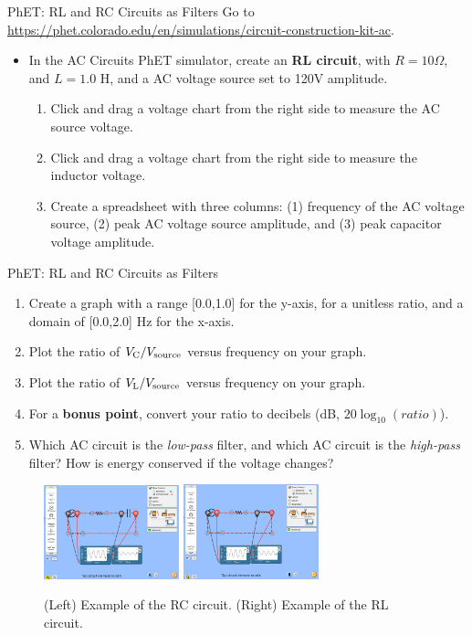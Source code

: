 \documentclass{beamer}
\begin{document}
\begin{frame}{PhET: RL and RC Circuits as Filters}
\footnotesize
Go to \url{https://phet.colorado.edu/en/simulations/circuit-construction-kit-ac}.
\begin{itemize}
\footnotesize
\item In the AC Circuits PhET simulator, create an \textbf{\alert{RL circuit}}, with $R = 10 \Omega$, and $L = 1.0$ H, and a AC voltage source set to 120V amplitude.
\begin{enumerate}
\footnotesize
\item Click and drag a voltage chart from the right side to measure the AC source voltage.
\item Click and drag a voltage chart from the right side to measure the inductor voltage.
\item Create a spreadsheet with three columns: (1) frequency of the AC voltage source, (2) peak AC voltage source amplitude, and (3) peak capacitor voltage amplitude.
\end{enumerate}
\end{itemize}
\end{frame}

\begin{frame}{PhET: RL and RC Circuits as Filters}
\footnotesize
\begin{enumerate}
\item Create a graph with a range [0.0,1.0] for the y-axis, for a unitless ratio, and a domain of [0.0,2.0] Hz for the x-axis.
\item Plot the ratio of $V_{\rm C}/V_{\rm source}$ versus frequency on your graph.
\item Plot the ratio of $V_{\rm L}/V_{\rm source}$ versus frequency on your graph.
\item For a \textbf{bonus point}, convert your ratio to decibels (dB, $20\log_{10}(ratio)$).
\item Which AC circuit is the \textit{low-pass} filter, and which AC circuit is the \textit{high-pass} filter?  How is energy conserved if the voltage changes?
\end{enumerate}
\begin{figure}
\centering
\includegraphics[width=0.35\textwidth]{figures/RC_PhET.png}
\includegraphics[width=0.35\textwidth]{figures/RL_PhET.png}
\caption{\label{fig:RC_RL_PhET} \footnotesize (Left) Example of the RC circuit. (Right) Example of the RL circuit.}
\end{figure}
\end{frame}
\end{document}

